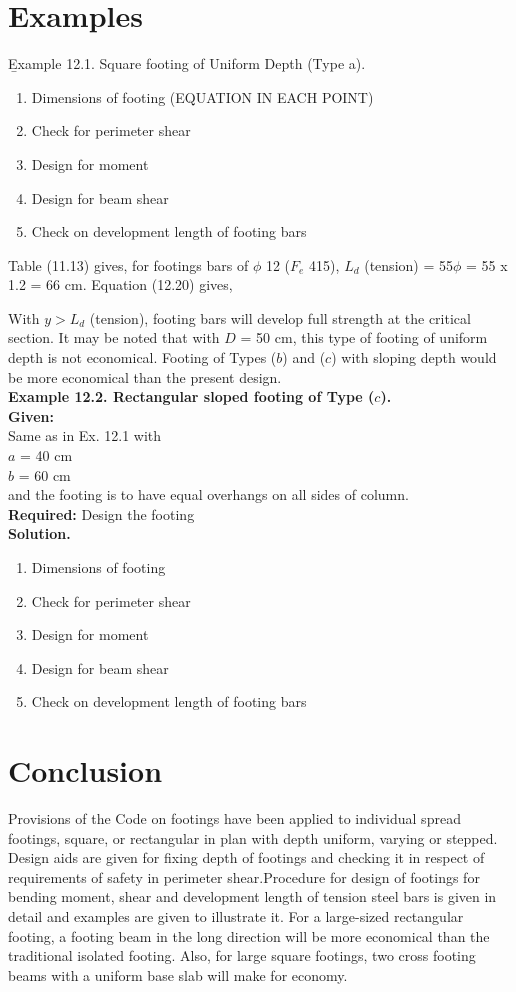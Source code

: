 \documentclass{book}
\begin{document}
\section{Examples}
\b Example 12.1. Square footing of Uniform Depth (Type a).
\begin{enumerate}
\item Dimensions of footing (EQUATION IN EACH POINT)
\item  Check for perimeter shear
\item  Design for moment
\item Design for beam shear
\item Check on development length of footing bars
\end{enumerate}
Table (11.13) gives, for footings bars of $\phi$ 12 ($F_e$ 415),
\newpage
$L_d$ (tension) = 55$\phi$ = 55 x 1.2 = 66 cm.
Equation (12.20) gives, 


With $y > L_d$ (tension), footing bars will develop full strength at the critical section. It may be noted that with $D$ = 50 cm, this type of footing of uniform depth is not economical. Footing of Types ($b$) and ($c$) with sloping depth would be more economical than the present design.\\

\textbf{ Example 12.2. Rectangular sloped footing of Type ($c$).}\\
\textbf{Given:}\\
Same as in Ex. 12.1 with\\
$a$ = 40 cm\\
$b$ = 60 cm\\ 
and the footing is to have equal overhangs on all sides of column.\\
\textbf{Required:} Design the footing\\
\textbf{Solution.}
\begin{enumerate}
\item  Dimensions of footing
\item Check for perimeter shear
\item Design for moment
\item Design for beam shear
\item Check on development length of footing bars
\end{enumerate}
\newpage
\section{Conclusion}
Provisions of the Code on footings have been applied to individual spread footings, square, or rectangular in plan with depth uniform, varying or stepped. Design aids are given for ﬁxing depth of footings and checking it in respect of requirements of safety in perimeter shear.Procedure for design of footings for bending moment, shear and development length of tension steel bars is given in detail and examples are given to illustrate it. For a large-sized rectangular footing, a footing beam in the long direction will be more economical than the traditional isolated footing. Also, for large square footings, two cross footing beams with a uniform base slab will make for economy.
\end{document}
